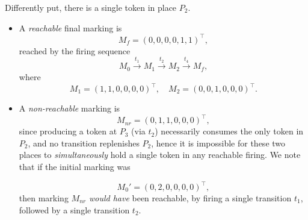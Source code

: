 Differently put, there is a single token in place $P_2$.


\begin{itemize}
	\item A \emph{reachable} final marking is
	\[
	M_f = (0,0,0,0,1,1)^\top,
	\]
	reached by the firing sequence
	\[
	M_0 \xrightarrow{t_1} M_1
	\xrightarrow{t_2} M_2
	\xrightarrow{t_4} M_f,
	\]
	where
	\[
	M_1 = (1,1,0,0,0,0)^\top,
	\quad
	M_2 = (0,0,1,0,0,0)^\top.
	\]
	\item A \emph{non-reachable} marking is
	\[
	M_{nr} = (0,1,1,0,0,0)^\top,
	\]
	since producing a token at \(P_3\) (via \(t_2\)) necessarily consumes the only token in \(P_2\), and no transition replenishes \(P_2\), hence it is impossible for these two places to \textit{simultaneously} hold a single token in any reachable firing. We note that if the initial marking was 
	
	\[
	M_0' = (0,2,0,0,0,0)^\top,
	\]
	then marking $M_{nr}$ \textit{would have} been reachable, by firing a single transition $t_1$, followed by a single transition $t_2$.
\end{itemize}






